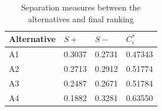 \begin{flushleft}
\begin{table}[h!]
\label{table:1}
\end{table}
\vspace{0.3cm}

\renewcommand{\arraystretch}{1}
\begin{table}[h!]
    \centering
     \caption{Separation measures between the alternatives and final
ranking}
  \begin{tabular}{ p{2cm} p{1.5cm} p{1.5cm} p{1.5cm}}
  \hline
  Alternative & $S+$ & $S-$ & $C_i^*$\\
  \hline
  A1 & 0.3037 & 0.2731 & 0.47343\\
A2 & 0.2713 & 0.2912 & 0.51774\\
A3 & 0.2487 & 0.2671 & 0.51784\\
A4 & 0.1882 & 0.3281 & 0.63550\\
    \hline
    \end{tabular}

\label{table:1}
\end{table}
\vspace{0.3cm}




\end{flushleft}
